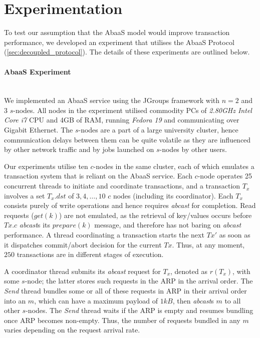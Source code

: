 \section{Experimentation}

To test our assumption that the \textsf{AbaaS} model would improve transaction performance, we developed an experiment that utilises the \textsf{AbaaS} Protocol (\ref{sec:decoupled_protocol}).  The details of these experiments are outlined below. 

\paragraph{AbaaS Experiment} \hspace{0pt} \\
We implemented an \textsf{AbaaS} service using the JGroups\citep{JGroups} framework with $n=2$ and $3$ $s$-nodes.  All nodes in the experiment utilised commodity PCs of \emph{2.80GHz Intel Core i7} CPU and 4GB of RAM, running \emph{Fedora 19} and communicating over Gigabit Ethernet. The $s$-nodes are a part of a large university cluster, hence communication delays between them can be quite volatile as they are influenced by other network traffic and by jobs launched on $s$-nodes by other users.

Our experiments utilise ten $c$-nodes in the same cluster, each of which emulates a transaction system that is reliant on the \textsf{AbaaS} service.  Each $c$-node operates 25 concurrent threads to initiate and coordinate transactions, and a transaction $T_x$ involves a set $T_x.dst$ of $3,4,\ldots,10$ $c$ nodes (including its coordinator). Each $T_x$ consists purely of write operations and hence requires \emph{abcast} for completion. Read requests ($get(k)$) are not emulated, as the retrieval of key/values occurs before $Tx.c$ \emph{abcast}s its $prepare(k)$ message, and therefore has not baring on \emph{abcast} performance.  A thread coordinating a transaction starts the next $Tx'$ as soon as it dispatches commit/abort decision for the current $Tx$. Thus, at any moment, $250$ transactions are in different stages of execution.

A coordinator thread submits its \emph{abcast} request for $T_x$, denoted as $r(T_x)$, with some $s$-node; the latter stores such requests in the ARP in the arrival order. The \emph{Send} thread bundles some or all of these requests in ARP in their arrival order into an $m$, which can have a maximum payload of $1kB$, then \emph{abcast}s $m$ to all other $s$-nodes.  The \emph{Send} thread waits if the ARP is empty and resumes bundling once ARP becomes non-empty. Thus, the number of requests bundled in any $m$ varies depending on the request arrival rate. 

